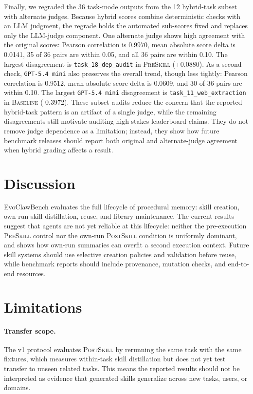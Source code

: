 \documentclass[11pt]{article}
\newcommand{\ours}{EvoClawBench}
\newcommand{\baseline}{\textsc{Baseline}}
\newcommand{\preskill}{\textsc{PreSkill}}
\newcommand{\postskill}{\textsc{PostSkill}}
\begin{document}
Finally, we regraded the 36 task-mode outputs from the 12 hybrid-task subset with alternate judges.
Because hybrid scores combine deterministic checks with an LLM judgment, the regrade holds the automated sub-scores fixed and replaces only the LLM-judge component.
One alternate judge shows high agreement with the original scores: Pearson correlation is 0.9970, mean absolute score delta is 0.0141, 35 of 36 pairs are within 0.05, and all 36 pairs are within 0.10.
The largest disagreement is \texttt{task\_18\_dep\_audit} in \preskill{} (+0.0880).
As a second check, \texttt{GPT-5.4 mini} also preserves the overall trend, though less tightly: Pearson correlation is 0.9512, mean absolute score delta is 0.0609, and 30 of 36 pairs are within 0.10.
The largest \texttt{GPT-5.4 mini} disagreement is \texttt{task\_11\_web\_extraction} in \baseline{} (-0.3972).
These subset audits reduce the concern that the reported hybrid-task pattern is an artifact of a single judge, while the remaining disagreements still motivate auditing high-stakes leaderboard claims.
They do not remove judge dependence as a limitation; instead, they show how future benchmark releases should report both original and alternate-judge agreement when hybrid grading affects a result.

\section{Discussion}
\label{sec:discussion}

\ours{} evaluates the full lifecycle of procedural memory: skill creation, own-run skill distillation, reuse, and library maintenance.
The current results suggest that agents are not yet reliable at this lifecycle: neither the pre-execution \preskill{} control nor the own-run \postskill{} condition is uniformly dominant, and  shows how own-run summaries can overfit a second execution context.
Future skill systems should use selective creation policies and validation before reuse, while benchmark reports should include provenance, mutation checks, and end-to-end resources.

\section*{Limitations}

\paragraph{Transfer scope.}
The v1 protocol evaluates \postskill{} by rerunning the same task with the same fixtures, which measures within-task skill distillation but does not yet test transfer to unseen related tasks.
This means the reported results should not be interpreted as evidence that generated skills generalize across new tasks, users, or domains.
\end{document}
